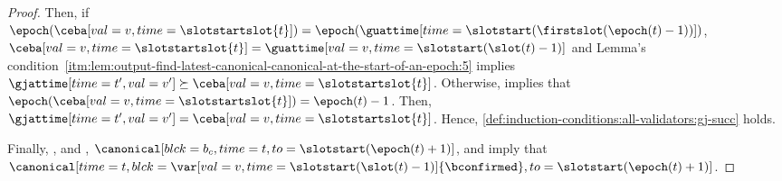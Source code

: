 \documentclass{article}
\begin{document}
\begin{proof}

        Then, if $\epoch(\ceba[val=v,time=\slotstartslot{t}])=\epoch(\guattime[time=\slotstart(\firstslot(\epoch(t)-1))])$, 
        $\ceba[val=v,time=\slotstartslot{t}]= \guattime[val=v,time={\slotstart(\slot({t})-1)}]$ and Lemma's condition~\ref{itm:lem:output-find-latest-canonical-canonical-at-the-start-of-an-epoch:5} implies $\gjattime[time=t',val=v']\succeq \ceba[val=v,time=\slotstartslot{t}]$.
        Otherwise,  implies that 
        $\epoch(\ceba[val=v,time=\slotstartslot{t}])=\epoch(t)-1$. 
        Then,  $\gjattime[time=t',val=v'] = \ceba[val=v,time=\slotstartslot{t}]$.
        Hence, \ref{def:induction-conditions:all-validators:gj-succ} holds.

        Finally, \sirone, \sirtwo and \sirthree,   $\canonical[blck={b_c},time=t, to=\slotstart(\epoch(t)+1)]$, and  imply that $\canonical[time=t,blck={\var[val=v,time=\slotstart(\slot(t)-1)]{\bconfirmed}},to=\slotstart(\epoch(t)+1)]$. 





\end{proof}

    
    
\end{document}

